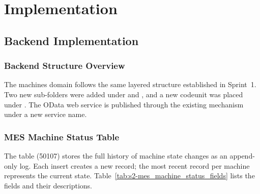 \section{Implementation}

\subsection{Backend Implementation}

\subsubsection*{Backend Structure Overview}

The machines domain follows the same layered structure established in Sprint~1.
Two new sub-folders were added under  and
, and a new codeunit was placed under
. The OData web service is published through
the existing  mechanism under a new service name.

\subsubsection*{MES Machine Status Table}

The  table (50107) stores the full history of
machine state changes as an append-only log. Each insert creates a new record;
the most recent record per machine represents the current state. Table~\ref{tab:s2-mes_machine_status_fields}
lists the fields and their descriptions.

